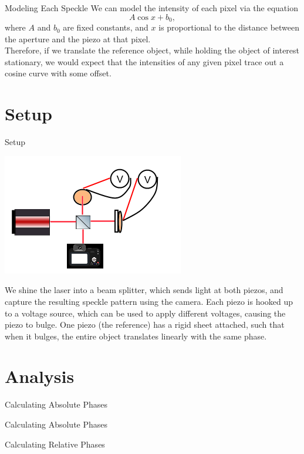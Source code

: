 \documentclass[pdf]{beamer}
\begin{document}
\begin{frame}{Modeling Each Speckle}
We can model the intensity of each pixel via the equation$$A\cos x + b_0,$$where $A$ and $b_0$ are fixed constants, and $x$ is proportional to the distance between the aperture and the piezo at that pixel.\\
\vspace{0.5cm}
Therefore, if we translate the reference object, while holding the object of interest stationary, we would expect that the intensities of any given pixel trace out a cosine curve with some offset.
\end{frame}

\section{Setup}
\begin{frame}{Setup}
\begin{center}
  \includegraphics[width=0.4\linewidth]{diagram.png}
\end{center}
We shine the laser into a beam splitter, which sends light at both piezos, and capture the resulting speckle pattern using the camera. Each piezo is hooked up to a voltage source, which can be used to apply different voltages, causing the piezo to bulge. One piezo (the reference) has a rigid sheet attached, such that when it bulges, the entire object translates linearly with the same phase.
\end{frame}

\section{Analysis}
\begin{frame}{Calculating Absolute Phases}

\end{frame}

\begin{frame}{Calculating Absolute Phases}

\end{frame}

\begin{frame}{Calculating Relative Phases}

\end{frame}
\end{document}
